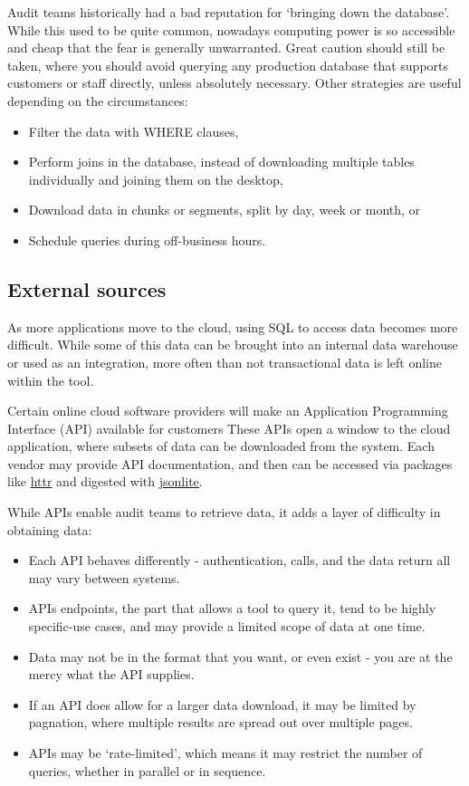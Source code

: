 \documentclass[
]{book}
\providecommand{\tightlist}{%
  \setlength{\itemsep}{0pt}\setlength{\parskip}{0pt}}
\begin{document}
Audit teams historically had a bad reputation for `bringing down the database'. While this used to be quite common, nowadays computing power is so accessible and cheap that the fear is generally unwarranted. Great caution should still be taken, where you should avoid querying any production database that supports customers or staff directly, unless absolutely necessary. Other strategies are useful depending on the circumstances:

\begin{itemize}
\tightlist
\item
  Filter the data with WHERE clauses,
\item
  Perform joins in the database, instead of downloading multiple tables individually and joining them on the desktop,
\item
  Download data in chunks or segments, split by day, week or month, or
\item
  Schedule queries during off-business hours.
\end{itemize}

\hypertarget{external-sources}{%
\subsection{External sources}\label{external-sources}}

As more applications move to the cloud, using SQL to access data becomes more difficult. While some of this data can be brought into an internal data warehouse or used as an integration, more often than not transactional data is left online within the tool.

Certain online cloud software providers will make an Application Programming Interface (API) available for customers These APIs open a window to the cloud application, where subsets of data can be downloaded from the system. Each vendor may provide API documentation, and then can be accessed via packages like \href{https://cran.r-project.org/web/packages/httr/index.html}{httr} and digested with \href{https://cran.r-project.org/web/packages/jsonlite/index.html}{jsonlite}.

While APIs enable audit teams to retrieve data, it adds a layer of difficulty in obtaining data:

\begin{itemize}
\tightlist
\item
  Each API behaves differently - authentication, calls, and the data return all may vary between systems.
\item
  APIs endpoints, the part that allows a tool to query it, tend to be highly specific-use cases, and may provide a limited scope of data at one time.
\item
  Data may not be in the format that you want, or even exist - you are at the mercy what the API supplies.
\item
  If an API does allow for a larger data download, it may be limited by pagnation, where multiple results are spread out over multiple pages.
\item
  APIs may be `rate-limited', which means it may restrict the number of queries, whether in parallel or in sequence.
\end{itemize}
\end{document}

